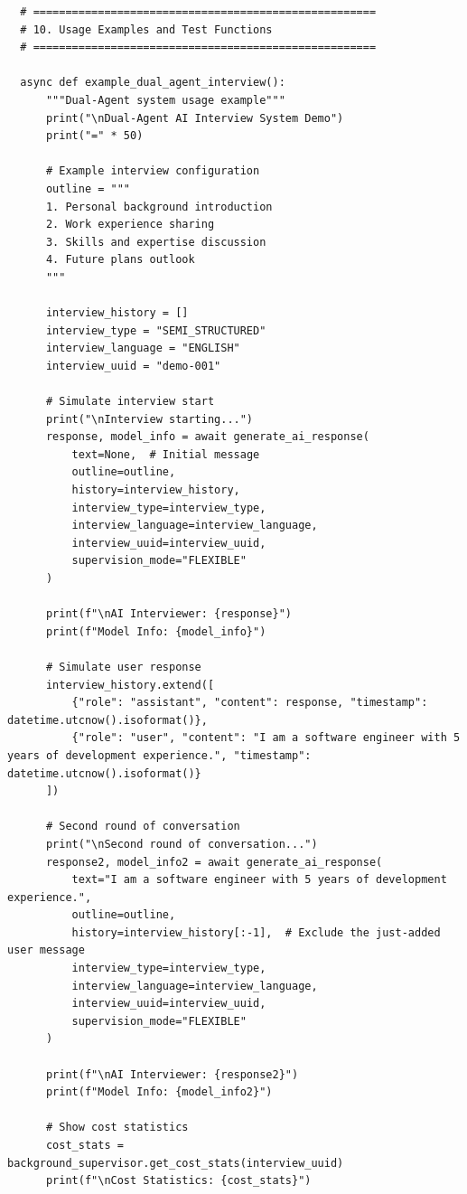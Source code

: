 \documentclass[sigchi,nonacm,manuscript]{acmart}
\begin{document}
\begin{lstlisting}
  # =====================================================
  # 10. Usage Examples and Test Functions
  # =====================================================

  async def example_dual_agent_interview():
      """Dual-Agent system usage example"""
      print("\nDual-Agent AI Interview System Demo")
      print("=" * 50)
      
      # Example interview configuration
      outline = """
      1. Personal background introduction
      2. Work experience sharing
      3. Skills and expertise discussion
      4. Future plans outlook
      """
      
      interview_history = []
      interview_type = "SEMI_STRUCTURED"
      interview_language = "ENGLISH"
      interview_uuid = "demo-001"
      
      # Simulate interview start
      print("\nInterview starting...")
      response, model_info = await generate_ai_response(
          text=None,  # Initial message
          outline=outline,
          history=interview_history,
          interview_type=interview_type,
          interview_language=interview_language,
          interview_uuid=interview_uuid,
          supervision_mode="FLEXIBLE"
      )
      
      print(f"\nAI Interviewer: {response}")
      print(f"Model Info: {model_info}")
      
      # Simulate user response
      interview_history.extend([
          {"role": "assistant", "content": response, "timestamp": datetime.utcnow().isoformat()},
          {"role": "user", "content": "I am a software engineer with 5 years of development experience.", "timestamp": datetime.utcnow().isoformat()}
      ])
      
      # Second round of conversation
      print("\nSecond round of conversation...")
      response2, model_info2 = await generate_ai_response(
          text="I am a software engineer with 5 years of development experience.",
          outline=outline,
          history=interview_history[:-1],  # Exclude the just-added user message
          interview_type=interview_type,
          interview_language=interview_language,
          interview_uuid=interview_uuid,
          supervision_mode="FLEXIBLE"
      )
      
      print(f"\nAI Interviewer: {response2}")
      print(f"Model Info: {model_info2}")
      
      # Show cost statistics
      cost_stats = background_supervisor.get_cost_stats(interview_uuid)
      print(f"\nCost Statistics: {cost_stats}")
      

\end{lstlisting}
\end{document}
